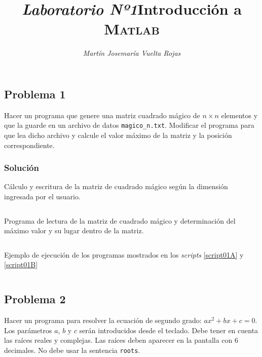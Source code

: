 \documentclass[a4paper,12pt,final]{article}
\begin{document}
  \title{\textit{\Large Laboratorio Nº1}\linebreak{}\linebreak{}\textbf{\Huge Introducción a \textsc{Matlab}}}
  \author{\emph{Martín Josemaría Vuelta Rojas}}
  \maketitle

  \subsection*{Problema 1}
    \noindent Hacer un programa que genere una matriz cuadrado mágico de
    $n\times n$ elementos y que la guarde en un archivo de datos
    \texttt{magico\_n.txt}. Modificar el programa para que lea dicho archivo
    y calcule el valor máximo de la matriz y la posición correspondiente.

    \subsubsection*{Solución}
      \begin{listing}[H]
        \caption{Cálculo y escritura de la matriz de cuadrado mágico según la
        dimensión ingresada por el usuario.}
        \label{script01A}
        \inputminted[firstline=5]{matlab}{./laboratorio_1/problema01_a.m}
      \end{listing}

      \begin{listing}[H]
        \caption{Programa de lectura de la matriz de cuadrado mágico y
        determinación del máximo valor y su lugar dentro de la matriz.}
        \label{script01B}
        \inputminted[firstline=5]{matlab}{./laboratorio_1/problema01_b.m}
      \end{listing}

      \begin{listing}[H]
        \caption{Ejemplo de ejecución de los programas mostrados en los
        \emph{scripts} \ref{script01A} y \ref{script01B}}
        \label{script01sample}
        \inputminted{text}{./laboratorio_1/problema01_sample.txt}
      \end{listing}
      \vspace{\fill}

  \newpage
  \subsection*{Problema 2}
    \noindent Hacer un programa para resolver la ecuación de segundo grado:
    $ax^2+bx+c=0$. Los parámetros $a$, $b$ y $c$ serán introducidos desde
    el teclado. Debe tener en cuenta las raíces reales y complejas. Las
    raíces deben aparecer en la pantalla con 6 decimales. No debe usar la
    sentencia \texttt{roots}.
\end{document}
